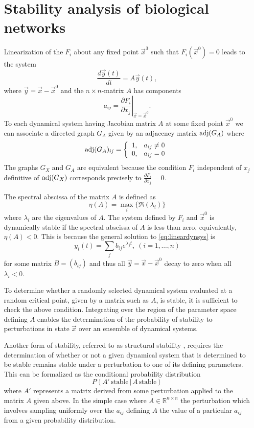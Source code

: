 \section{Stability analysis of biological networks}
Linearization of the $F_i$ about any fixed point $\vec{x}^0$ such that $F_i(\vec{x}^0)=0$ leads to the system
\begin{equation}\label{eq:lineardynsys}
\frac{d\vec{y}(t)}{dt} = A \vec{y}(t),
\end{equation}
where $\vec{y} = \vec{x} - \vec{x}^0$ and the $n \times n$-matrix $A$ has components
$$
a_{ij} = \left. \frac{\partial F_i}{\partial x_j} \right|_{\vec{x} = \vec{x}^0}.
$$
To each dynamical system having Jacobian matrix $A$ at some fixed point $\vec{x}^0$ we can associate a directed graph $G_A$ given by an adjacency matrix $\mathrm{adj}(G_A)$ where
 \begin{displaymath}
   \mathrm{adj}(G_A)_{ij} = \left\{
     \begin{array}{lr}
       1, & a_{ij} \neq 0\\
       0, & a_{ij} = 0
     \end{array}
   \right.
\end{displaymath}
The graphs $G_X$ and $G_A$ are equivalent because the condition $F_i$ independent of $x_j$ definitive of $\mathrm{adj}(G_X)$ corresponds precisely to $\frac{\partial F_i}{\partial x_j}=0$.

The spectral abscissa of the matrix $A$ is defined as
$$
\eta(A) = \max_i \{\Re(\lambda_i)\}
$$
where $\lambda_i$ are the eigenvalues of $A$. The system defined by $F_i$ and $\vec{x}^0$ is dynamically stable if the spectral abscissa of $A$ is less than zero, equivalently, $\eta(A) < 0$. This is because the general solution to \ref{eq:lineardynsys} is
$$
y_i(t) = \sum_j b_{ij} e^{\lambda_j t}, \; (i=1,\ldots,n)
$$
for some matrix $B=(b_{ij})$ and thus all $\vec{y} = \vec{x} - \vec{x}^0$ decay to zero when all $\lambda_i < 0$.

To determine whether a randomly selected dynamical system evaluated at a random critical point, given by a matrix such as $A$, is stable, it is sufficient to check the above condition. Integrating over the region of the parameter space defining $A$ enables the determination of the probability of stability to perturbations in state $\vec{x}$ over an ensemble of dynamical systems.

Another form of stability, referred to as structural stability \cite{Smale1967}, requires the determination of whether or not a given dynamical system that is determined to be stable remains stable under a perturbation to one of its defining parameters. This can be formalized as the conditional probability distribution
$$
P(A' \, \textrm{stable}\, \big| \, A \, \textrm{stable})
$$
where $A'$ represents a matrix derived from some perturbation applied to the matrix $A$ given above. In the simple case where $A \in \mathbb{R}^{n \times n}$ the perturbation which involves sampling uniformly over the $a_{ij}$ defining $A$ the value of a particular $a_{ij}$ from a given probability distribution.

